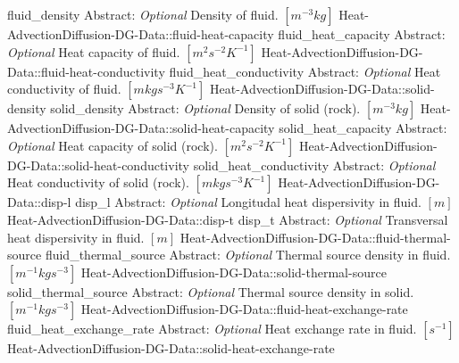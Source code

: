 \begin{RecordType}
			{fluid{\_}density}
			{{Abstract}{: }}
			{ \it{Optional} }
			{{{Density of fluid. }{$[m^{-3}kg]$}}}
		\RecKey
			{Heat-AdvectionDiffusion-DG-Data::fluid-heat-capacity}
			{fluid{\_}heat{\_}capacity}
			{{Abstract}{: }}
			{ \it{Optional} }
			{{{Heat capacity of fluid. }{$[m^{2}s^{-2}K^{-1}]$}}}
		\RecKey
			{Heat-AdvectionDiffusion-DG-Data::fluid-heat-conductivity}
			{fluid{\_}heat{\_}conductivity}
			{{Abstract}{: }}
			{ \it{Optional} }
			{{{Heat conductivity of fluid. }{$[mkgs^{-3}K^{-1}]$}}}
		\RecKey
			{Heat-AdvectionDiffusion-DG-Data::solid-density}
			{solid{\_}density}
			{{Abstract}{: }}
			{ \it{Optional} }
			{{{Density of solid (rock). }{$[m^{-3}kg]$}}}
		\RecKey
			{Heat-AdvectionDiffusion-DG-Data::solid-heat-capacity}
			{solid{\_}heat{\_}capacity}
			{{Abstract}{: }}
			{ \it{Optional} }
			{{{Heat capacity of solid (rock). }{$[m^{2}s^{-2}K^{-1}]$}}}
		\RecKey
			{Heat-AdvectionDiffusion-DG-Data::solid-heat-conductivity}
			{solid{\_}heat{\_}conductivity}
			{{Abstract}{: }}
			{ \it{Optional} }
			{{{Heat conductivity of solid (rock). }{$[mkgs^{-3}K^{-1}]$}}}
		\RecKey
			{Heat-AdvectionDiffusion-DG-Data::disp-l}
			{disp{\_}l}
			{{Abstract}{: }}
			{ \it{Optional} }
			{{{Longitudal heat dispersivity in fluid. }{$[m]$}}}
		\RecKey
			{Heat-AdvectionDiffusion-DG-Data::disp-t}
			{disp{\_}t}
			{{Abstract}{: }}
			{ \it{Optional} }
			{{{Transversal heat dispersivity in fluid. }{$[m]$}}}
		\RecKey
			{Heat-AdvectionDiffusion-DG-Data::fluid-thermal-source}
			{fluid{\_}thermal{\_}source}
			{{Abstract}{: }}
			{ \it{Optional} }
			{{{Thermal source density in fluid. }{$[m^{-1}kgs^{-3}]$}}}
		\RecKey
			{Heat-AdvectionDiffusion-DG-Data::solid-thermal-source}
			{solid{\_}thermal{\_}source}
			{{Abstract}{: }}
			{ \it{Optional} }
			{{{Thermal source density in solid. }{$[m^{-1}kgs^{-3}]$}}}
		\RecKey
			{Heat-AdvectionDiffusion-DG-Data::fluid-heat-exchange-rate}
			{fluid{\_}heat{\_}exchange{\_}rate}
			{{Abstract}{: }}
			{ \it{Optional} }
			{{{Heat exchange rate in fluid. }{$[s^{-1}]$}}}
		\RecKey
			{Heat-AdvectionDiffusion-DG-Data::solid-heat-exchange-rate}

\end{RecordType}
